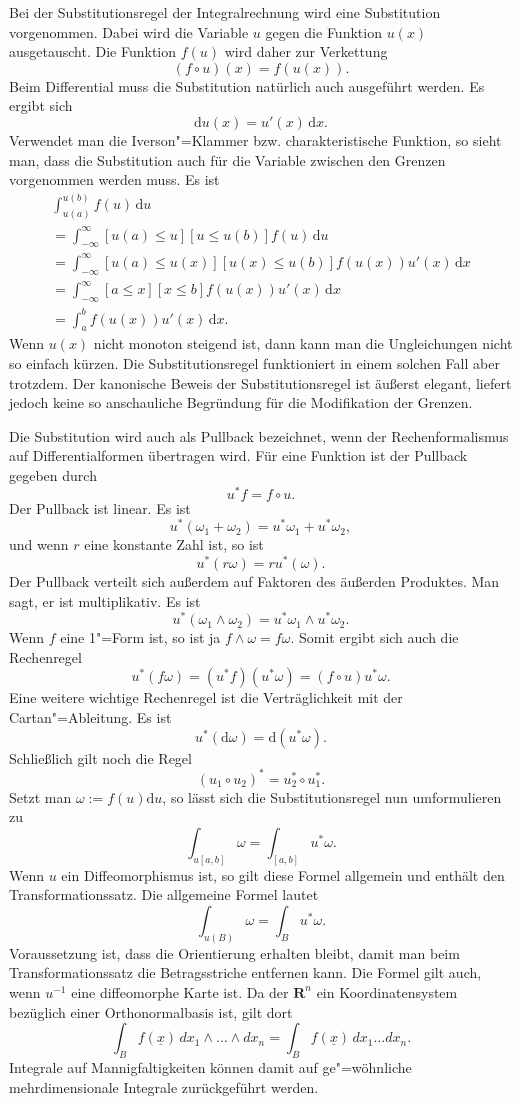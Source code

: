 \documentclass[a4paper,10pt,fleqn,twocolumn,twoside]{article}
\begin{document}
Bei der Substitutionsregel der Integralrechnung wird eine
Substitution vorgenommen. Dabei wird die Variable \(u\) gegen die Funktion
\(u(x)\) ausgetauscht. Die Funktion \(f(u)\) wird daher zur
Verkettung
\[(f\circ u)(x) = f(u(x)).\]
Beim Differential muss die Substitution natürlich auch ausgeführt
werden. Es ergibt sich
\[\mathrm du(x) = u'(x)\,\mathrm dx.\]
Verwendet man die Iverson"=Klammer bzw. charakteristische Funktion,
so sieht man, dass die Substitution auch für die Variable zwischen
den Grenzen vorgenommen werden muss. Es ist
\begin{gather*}
\int_{u(a)}^{u(b)} f(u)\,\mathrm du\\
= \int_{-\infty}^{\infty} [u(a)\le u][u\le u(b)] f(u)\,\mathrm du\\
= \int_{-\infty}^{\infty} [u(a)\le u(x)][u(x) \le u(b)] f(u(x))u'(x)\,\mathrm dx\\
= \int_{-\infty}^{\infty} [a\le x][x\le b] f(u(x)) u'(x)\,\mathrm dx\\
= \int_a^b f(u(x))u'(x)\,\mathrm dx.
\end{gather*}
Wenn \(u(x)\) nicht monoton steigend ist, dann kann man die
Ungleichungen nicht so einfach kürzen. Die Substitutionsregel
funktioniert in einem solchen Fall aber trotzdem. Der kanonische
Beweis der Substitutionsregel ist äußerst elegant, liefert jedoch
keine so anschauliche Begründung für die Modifikation der Grenzen.

Die Substitution wird auch als Pullback bezeichnet, wenn der
Rechenformalismus auf Differentialformen übertragen wird. Für
eine Funktion ist der Pullback gegeben durch
\[u^{*}f = f\circ u.\]
Der Pullback ist linear. Es ist
\[u^{*}(\omega_1+\omega_2)
= u^{*}\omega_1+u^{*}\omega_2,\]
und wenn \(r\) eine konstante Zahl ist, so ist
\[u^{*}(r\omega) = ru^{*}(\omega).\]
Der Pullback verteilt sich außerdem auf Faktoren des
äußerden Produktes. Man sagt, er ist multiplikativ. Es ist
\[u^{*}(\omega_1\wedge\omega_2)
= u^{*}\omega_1\wedge u^{*}\omega_2.\]
Wenn \(f\) eine 1"=Form ist, so ist ja \(f\wedge\omega = f\omega.\)
Somit ergibt sich auch die Rechenregel
\[u^{*}(f\omega) = (u^{*}f)(u^{*}\omega)
= (f\circ u)u^{*}\omega.\] 
Eine weitere wichtige Rechenregel ist die Verträglichkeit
mit der Cartan"=Ableitung. Es ist
\[u^{*}(\mathrm d\omega) = \mathrm d(u^{*}\omega).\]
Schließlich gilt noch die Regel
\[(u_1\circ u_2)^{*} = u_2^{*}\circ u_1^{*}.\]
Setzt man \(\omega:=f(u)\mathrm du\), so lässt sich die
Substitutionsregel nun umformulieren zu
\[\int_{u[a,b]} \omega = \int_{[a,b]} u^{*}\omega.\]
Wenn \(u\) ein Diffeomorphismus ist, so gilt diese Formel
allgemein und enthält den Transformationssatz. Die allgemeine Formel
lautet
\[\int_{u(B)} \omega = \int_{B} u^{*}\omega.\]
Voraussetzung ist, dass die Orientierung erhalten bleibt, damit man
beim Transformationssatz die Betragsstriche entfernen kann.
Die Formel gilt auch, wenn \(u^{-1}\) eine diffeomorphe Karte ist.
Da der \(\mathbf R^n\) ein Koordinatensystem bezüglich einer
Orthonormalbasis ist, gilt dort
\[\int_B f(\underline x)\, dx_1\wedge\ldots\wedge dx_n
= \int_B f(\underline x)\, dx_1\ldots dx_n.\]
Integrale auf Mannigfaltigkeiten können damit auf ge"=wöhnliche
mehrdimensionale Integrale zurückgeführt werden.
\end{document}
